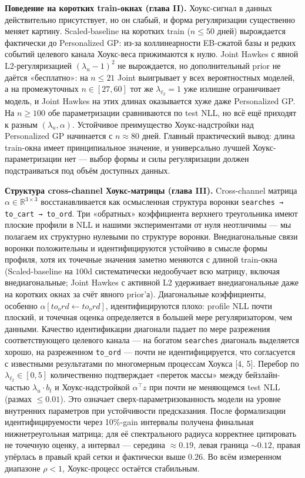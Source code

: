 \documentclass[12pt,a4paper]{article}
\begin{document}
\textbf{Поведение на коротких train-окнах (глава II).} Хоукс-сигнал в данных действительно присутствует, но он слабый, и форма регуляризации существенно меняет картину. Scaled-baseline на коротких train ($n \leq  50$ дней) вырождается фактически до Personalized GP: из-за коллинеарности EB-сжатой базы и редких событий целевого канала Хоукс-веса прижимаются к нулю. Joint Hawkes с явной L2-регуляризацией $(\lambda _u - 1)^2$ не вырождается, но дополнительный prior не даётся «бесплатно»: на $n \leq  21$ Joint выигрывает у всех вероятностных моделей, а на промежуточных $n \in  [27, 60]$ тот же $\lambda _{\ell_2} = 1$ уже излишне ограничивает модель, и Joint Hawkes на этих длинах оказывается хуже даже Personalized GP. На $n \geq  100$ обе параметризации сравниваются по test NLL, но всё ещё приходят к разным $(\lambda _u, \alpha )$. Устойчивое преимущество Хоукс-надстройки над Personalized GP начинается с $n \approx  80$ дней. Главный практический вывод: длина train-окна имеет принципиальное значение, и универсально лучшей Хоукс-параметризации нет --- выбор формы и силы регуляризации должен подстраиваться под объём доступных данных.

\textbf{Структура cross-channel Хоукс-матрицы (глава III).} Cross-channel матрица $\alpha  \in  \mathbb{R}^{3\times 3}$ восстанавливается как осмысленная структура воронки \texttt{searches → to\_cart → to\_ord}. Три «обратных» коэффициента верхнего треугольника имеют плоские профили в NLL и нашими экспериментами от нуля неотличимы --- мы полагаем их структурно нулевыми по структуре воронки. Внедиагональные связи воронки положительны и идентифицируются устойчиво в смысле формы профиля, хотя их точечные значения заметно меняются с длиной train-окна (Scaled-baseline на $100\text{d}$ систематически недообучает всю матрицу, включая внедиагональные; Joint Hawkes с активной L2 удерживает внедиагональные даже на коротких окнах за счёт явного prior'а). Диагональные коэффициенты, особенно $\alpha [to_ord \leftarrow  to_ord]$, идентифицируются плохо: profile NLL почти плоский, и точечная оценка определяется в большей мере регуляризатором, чем данными. Качество идентификации диагонали падает по мере разрежения соответствующего целевого канала --- на богатом \texttt{searches} диагональ выделяется хорошо, на разреженном \texttt{to\_ord} --- почти не идентифицируется, что согласуется с известными результатами по многомерным процессам Хоукса [4, 5]. Перебор по $\lambda _{\ell_2} \in  [0, 5]$ количественно подтверждает «переток массы» между бейзлайн-частью $\lambda _u \cdot  b_t$ и Хоукс-надстройкой $\alpha ^{\top} z$ при почти не меняющемся test NLL (размах $\leq 0.01$). Это означает сверх-параметризованность модели на уровне внутренних параметров при устойчивости предсказания. После формализации идентифицируемости через 10\%-gain интервалы получена финальная нижнетреугольная матрица; для её спектрального радиуса корректнее цитировать не точечную оценку, а интервал --- середина $\approx 0.19$, левая граница $\sim 0.12$, правая упёрлась в правый край сетки и фактически выше $0.26$. Во всём измеренном диапазоне $\rho < 1$, Хоукс-процесс остаётся стабильным.
\end{document}
